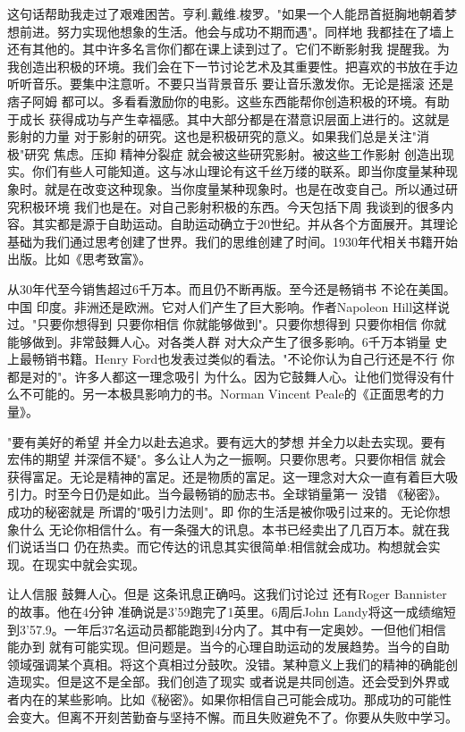 这句话帮助我走过了艰难困苦。亨利.戴维.梭罗。"如果一个人能昂首挺胸地朝着梦想前进。努力实现他想象的生活。他会与成功不期而遇"。同样地 我都挂在了墙上 还有其他的。其中许多名言你们都在课上读到过了。它们不断影射我 提醒我。为我创造出积极的环境。我们会在下一节讨论艺术及其重要性。把喜欢的书放在手边 听听音乐。要集中注意听。不要只当背景音乐 要让音乐激发你。无论是摇滚 还是痞子阿姆 都可以。多看看激励你的电影。这些东西能帮你创造积极的环境。有助于成长 获得成功与产生幸福感。其中大部分都是在潜意识层面上进行的。这就是影射的力量 对于影射的研究。这也是积极研究的意义。如果我们总是关注"消极"研究 焦虑。压抑 精神分裂症 就会被这些研究影射。被这些工作影射 创造出现实。你们有些人可能知道。这与冰山理论有这千丝万缕的联系。即当你度量某种现象时。就是在改变这种现象。当你度量某种现象时。也是在改变自己。所以通过研究积极环境 我们也是在。对自己影射积极的东西。今天包括下周 我谈到的很多内容。其实都是源于自助运动。自助运动确立于20世纪。并从各个方面展开。其理论基础为我们通过思考创建了世界。我们的思维创建了时间。1930年代相关书籍开始出版。比如《思考致富》。 

从30年代至今销售超过6千万本。而且仍不断再版。至今还是畅销书 不论在美国。中国 印度。非洲还是欧洲。它对人们产生了巨大影响。作者Napoleon Hill这样说过。"只要你想得到 只要你相信 你就能够做到"。只要你想得到 只要你相信 你就能够做到。非常鼓舞人心。对各类人群 对大众产生了很多影响。6千万本销量 史上最畅销书籍。Henry Ford也发表过类似的看法。"不论你认为自己行还是不行 你都是对的"。许多人都这一理念吸引 为什么。因为它鼓舞人心。让他们觉得没有什么不可能的。另一本极具影响力的书。Norman Vincent Peale的《正面思考的力量》。 

"要有美好的希望 并全力以赴去追求。要有远大的梦想 并全力以赴去实现。要有宏伟的期望 并深信不疑"。多么让人为之一振啊。只要你思考。只要你相信 就会获得富足。无论是精神的富足。还是物质的富足。这一理念对大众一直有着巨大吸引力。时至今日仍是如此。当今最畅销的励志书。全球销量第一 没错 《秘密》。成功的秘密就是 所谓的"吸引力法则"。即 你的生活是被你吸引过来的。无论你想象什么 无论你相信什么。有一条强大的讯息。本书已经卖出了几百万本。就在我们说话当口 仍在热卖。而它传达的讯息其实很简单:相信就会成功。构想就会实现。在现实中就会实现。 

让人信服 鼓舞人心。但是 这条讯息正确吗。这我们讨论过 还有Roger Bannister的故事。他在4分钟 准确说是3'59跑完了1英里。6周后John Landy将这一成绩缩短到3'57.9。一年后37名运动员都能跑到4分内了。其中有一定奥妙。一但他们相信能办到 就有可能实现。但问题是。当今的心理自助运动的发展趋势。当今的自助领域强调某个真相。将这个真相过分鼓吹。没错。某种意义上我们的精神的确能创造现实。但是这不是全部。我们创造了现实 或者说是共同创造。还会受到外界或者内在的某些影响。比如《秘密》。如果你相信自己可能会成功。那成功的可能性会变大。但离不开刻苦勤奋与坚持不懈。而且失败避免不了。你要从失败中学习。 


